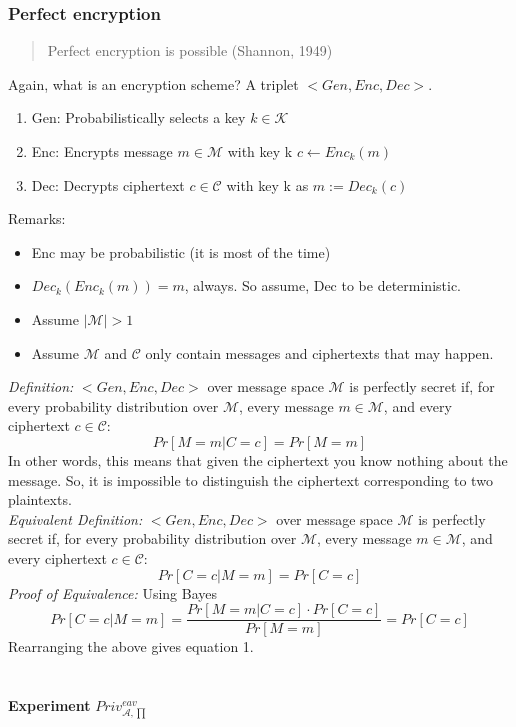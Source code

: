 \documentclass[12pt]{article}   	%
\begin{document}
\subsubsection{Perfect encryption}
\begin{quote}
Perfect encryption is possible (Shannon, 1949)
\end{quote}
Again, what is an encryption scheme? A triplet $<Gen, Enc, Dec>$.
\begin{enumerate}
\item Gen: Probabilistically selects a key $k \in \mathcal{K}$
\item Enc: Encrypts message $m \in \mathcal{M}$ with key k $c \leftarrow Enc_k(m)$
\item Dec: Decrypts ciphertext $c \in \mathcal{C}$ with key k as $m := Dec_k(c)$
\end{enumerate}
Remarks:
\begin{itemize}
\item Enc may be probabilistic (it is most of the time)
\item $Dec_k(Enc_k(m))=m$, always. So assume, Dec to be deterministic.
\item Assume $|\mathcal{M}| > 1$
\item Assume $\mathcal{M}$ and $\mathcal{C}$ only contain messages and ciphertexts that may happen.
\end{itemize}
\emph{Definition:} $<Gen, Enc, Dec>$ over message space $\mathcal{M}$ is perfectly secret if, for every probability distribution over $\mathcal{M}$, every message $m \in \mathcal{M}$, and every ciphertext $c \in \mathcal{C}$:
\begin{equation}
Pr[M=m|C=c] = Pr[M=m]
\end{equation}
In other words, this means that given the ciphertext you know nothing about the message. So, it is impossible to distinguish the ciphertext corresponding to two plaintexts.\\
\emph{Equivalent Definition:} $<Gen, Enc, Dec>$ over message space $\mathcal{M}$ is perfectly secret if, for every probability distribution over $\mathcal{M}$, every message $m \in \mathcal{M}$, and every ciphertext $c \in \mathcal{C}$:
\begin{equation}
Pr[C=c|M=m] = Pr[C=c]
\end{equation}
\emph{Proof of Equivalence:} Using Bayes
\begin{equation}
Pr[C=c|M=m] = \frac{Pr[M=m|C=c] \cdot Pr[C=c]}{Pr[M=m]} = Pr[C=c]
\end{equation}
Rearranging the above gives equation 1.\\
\\
\\
\textbf{Experiment} $Priv_{\mathcal{A},\prod}^{eav}$
\end{document}

